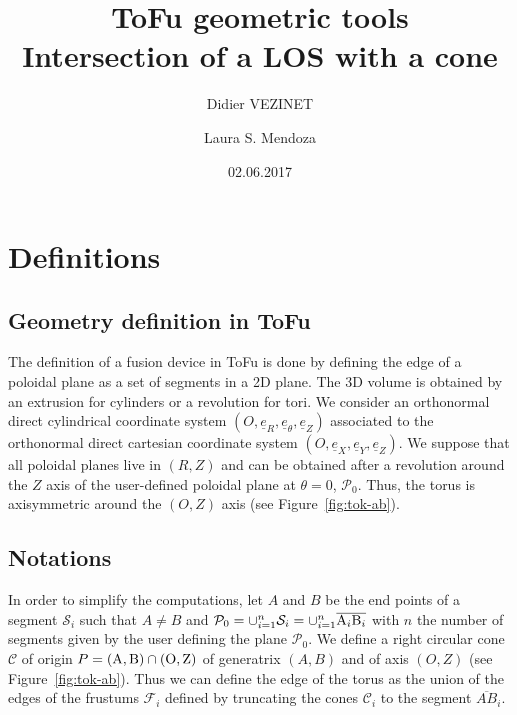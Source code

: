 \documentclass[a4paper,11pt,twoside,titlepage,openright]{book}
\numberwithin{equation}{section}
\newcommand{\ud}[1]{\underline{#1}}
\begin{document}
\title{ToFu geometric tools\\ Intersection of a LOS with a cone}
\author{Didier VEZINET \and Laura S. Mendoza}
\date{02.06.2017}
\maketitle

\tableofcontents




\chapter{Definitions}

\section{Geometry definition in ToFu}

The definition of a fusion device in ToFu is done by defining the edge of a poloidal plane as a set of segments in a 2D plane. The 3D volume is obtained by an extrusion for cylinders or a revolution for tori.
We consider an orthonormal direct cylindrical coordinate system $(O,\ud{e}_R,\ud{e}_{\theta},\ud{e}_Z)$ associated to the orthonormal direct cartesian coordinate system $(O,\ud{e}_X,\ud{e}_Y,\ud{e}_Z)$. We suppose that all poloidal planes live in $(R,Z)$ and can be obtained after a revolution around the $Z$ axis of the user-defined poloidal plane at $\theta=0$, $\mathcal{P}_0$. Thus, the torus is axisymmetric around the $(O,Z)$ axis (see Figure~\ref{fig:tok-ab}).




\begin{figure}[h]
\end{figure}

\section{Notations}

In order to simplify the computations, let $A$ and $B$ be the end points of a segment $\mathcal{S}_i$ such that $A\neq B$ and $\mathcal{P}_0 = \cup_{i=1}^{n} \mathcal{S}_i = \cup_{i=1}^n \overline{{\rm A}_i{\rm B}_i}$ with $n$ the number of segments given by the user defining the plane $\mathcal{P}_0$. We define a right circular cone $\mathcal{C}$ of origin $P = ({\rm A},{\rm B}) \cap ({\rm O}, {\rm Z})$ of generatrix $(A,B)$ and of axis $(O,Z)$ (see Figure~\ref{fig:tok-ab}). Thus we can define the edge of the torus as the union of the edges of the frustums $\mathcal{F}_i$ defined by truncating the cones $\mathcal{C}_i$ to the segment $\overline{AB}_i$.
\end{document}
